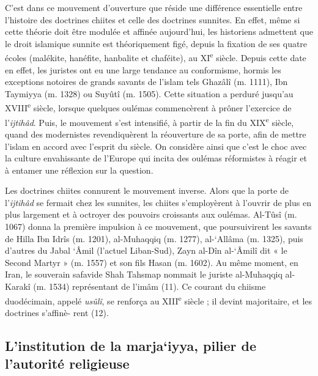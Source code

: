 C'est dans ce mouvement d'ouverture que réside une différence
essentielle entre l'histoire des doctrines chiites et celle des
doctrines sunnites. En effet, même si cette théorie doit être modulée et
affinée aujourd'hui, les historiens admettent que le droit islamique
sunnite est théoriquement figé, depuis la fixation de ses quatre écoles
(malékite, hanéfite, hanbalite et chaféite), au XI\textsuperscript{e}
siècle. Depuis cette date en effet, les juristes ont eu une large
tendance au conformisme, hormis les exceptions notoires de grands
savants de l'islam tels Ghazâlî (m. 1111), Ibn Taymiyya (m. 1328) ou
Suyûtî (m. 1505). Cette situation a perduré jusqu'au
XVIII\textsuperscript{e} siècle, lorsque quelques oulémas commencèrent à
prôner l'exercice de l'\emph{ijtihâd}. Puis, le mouvement s'est
intensifié, à partir de la fin du XIX\textsuperscript{e} siècle, quand
des modernistes revendiquèrent la réouverture de sa porte, afin de
mettre l'islam en accord avec l'esprit du siècle. On considère ainsi que
c'est le choc avec la culture envahissante de l'Europe qui incita des
oulémas réformistes à réagir et à entamer une réflexion sur la question.

Les doctrines chiites connurent le mouvement inverse. Alors que la porte
de l'\emph{ijtihâd} se fermait chez les sunnites, les chiites
s'employèrent à l'ouvrir de plus en plus largement et à octroyer des
pouvoirs croissants aux oulémas. Al-Tûsî (m. 1067) donna la première
impulsion à ce mouvement, que poursuivirent les savants de Hilla Ibn
Idrîs (m. 1201), al-Muhaqqiq (m. 1277), al-`Allâma (m. 1325), puis
d'autres du Jabal `Âmil (l'actuel Liban-Sud), Zayn al-Dîn al-`Âmilî dit
« le Second Martyr » (m. 1557) et son fils Hasan (m. 1602). Au même
moment, en Iran, le souverain safavide Shah Tahsmap nommait le juriste
al-Muhaqqiq al-Karakî (m. 1534) représentant de l'imâm (11). Ce courant
du chiisme duodécimain, appelé \emph{usûlî}, se renforça au
XIII\textsuperscript{e} siècle ; il devint majoritaire, et les doctrines
s'affinè- rent (12).

\hypertarget{linstitution-de-la-marjaiyya-pilier-de-lautorituxe9-religieuse}{%
\subsection{L'institution de la marja`iyya, pilier de l'autorité
religieuse}\label{linstitution-de-la-marjaiyya-pilier-de-lautorituxe9-religieuse}}

